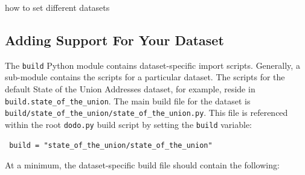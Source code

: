 how to set different datasets

\subsection{Adding Support For Your Dataset}
The \verb/build/ Python module contains dataset-specific import scripts.
Generally, a sub-module contains the scripts for a particular dataset. The
scripts for the default State of the Union Addresses dataset, for example,
reside in \verb/build.state_of_the_union/. The main build file for the dataset
is \verb#build/state_of_the_union/state_of_the_union.py#. This file is
referenced within the root \verb/dodo.py/ build script by setting the
\verb/build/ variable:
\begin{verbatim}
 build = "state_of_the_union/state_of_the_union"
\end{verbatim}

At a minimum, the dataset-specific build file should contain the following:

